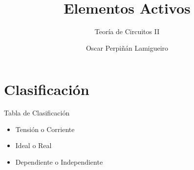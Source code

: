 \documentclass[aspectratio=169, usenames,svgnames,dvipsnames]{beamer}
\author{Oscar Perpiñán Lamigueiro}
\date{}
\title{Elementos Activos}
\subtitle{Teoría de Circuitos II}
\begin{document}
\maketitle

\section{Clasificación}
\label{sec:org0c08b84}
\begin{frame}[label={sec:org7e0905d}]{Tabla de Clasificación}
\begin{itemize}
\item Tensión o Corriente
\item Ideal o Real
\item Dependiente o Independiente
\end{itemize}
\end{frame}
\end{document}

